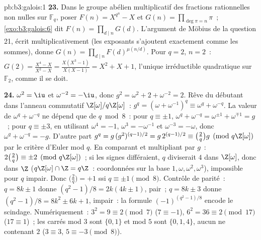\begin{solution}{pb:b3:galois:1}
\textbf{23.} Dans le groupe abélien multiplicatif des
fractions rationnelles non nulles sur $\mathbb F_q$, poser
$F(n) = X^{q^n} - X$ et $G(n) = \prod_{\deg\pi = n}\pi$~;
\cref{exo:b3:galois:6} dit $F(n) = \prod_{d\mid n}G(d)$.
L'argument de Möbius de la question 21, écrit
multiplicativement (les exposants s'ajoutent exactement comme
les sommes), donne $G(n) = \prod_{d \mid
n}F(d)^{\mu(n/d)}$. Pour $q = 2$, $n = 2$~: $G(2) =
\frac{X^4 - X}{X^2 - X} = \frac{X(X^3 - 1)}{X(X - 1)} = X^2 +
X + 1$, l'unique irréductible quadratique sur $\mathbb F_2$,
comme il se doit.

\textbf{24.} $\omega^2 = \iu$ et $\omega^{-2} = -\iu$, donc
$g^2 = \omega^2 + 2 + \omega^{-2} = 2$. Rêve du débutant dans
l'anneau commutatif $\Z[\omega]/q\Z[\omega]$~: $g^q =
(\omega + \omega^{-1})^q \equiv \omega^q + \omega^{-q}$. La
valeur de $\omega^q + \omega^{-q}$ ne dépend que de $q \bmod
8$~: pour $q \equiv \pm1$, $\omega^q + \omega^{-q} =
\omega^{\pm1} + \omega^{\mp1} = g$~; pour $q \equiv \pm3$, en
utilisant $\omega^4 = -1$, $\omega^{3} = -\omega^{-1}$ et
$\omega^{-3} = -\omega$, donc $\omega^q + \omega^{-q} = -g$.
D'autre part $g^q = g\,(g^2)^{(q-1)/2} = g\,2^{(q-1)/2}
\equiv \bigl(\frac2q\bigr) g \pmod{q\Z[\omega]}$ par le
critère d'Euler mod $q$. En comparant et multipliant par
$g$~: $2\bigl(\frac2q\bigr) \equiv \pm2
\pmod{q\Z[\omega]}$~; si les signes différaient, $q$ diviserait
$4$ dans $\Z[\omega]$, donc dans $\Z$ ($q\Z[\omega] \cap \Z =
q\Z$~: coordonnées sur la base $1, \omega, \omega^2,
\omega^3$), impossible pour $q$ impair. Donc
$\bigl(\frac2q\bigr) = +1$ ssi $q \equiv \pm1 \pmod 8$.
Contrôle de parité~: $q = 8k \pm 1$ donne $(q^2 - 1)/8 =
2k(4k \pm 1)$, pair~; $q = 8k \pm 3$ donne $(q^2 - 1)/8 =
8k^2 \pm 6k + 1$, impair~: la formule $(-1)^{(q^2-1)/8}$
encode le scindage. Numériquement~: $3^2 = 9 \equiv 2 \pmod
7$ ($7 \equiv -1$), $6^2 = 36 \equiv 2 \pmod{17}$ ($17
\equiv 1$)~; les carrés mod $3$ sont $\{0, 1\}$ et mod $5$
sont $\{0, 1, 4\}$, aucun ne contenant $2$ ($3 \equiv 3$, $5
\equiv -3 \pmod 8$).


\end{solution}
